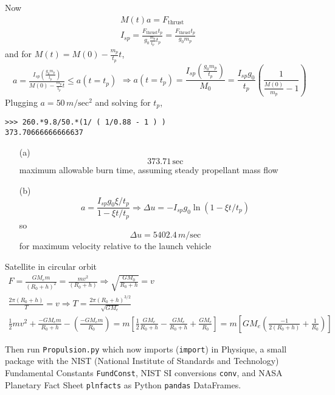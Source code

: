 \documentclass[10pt]{amsart}
\newcommand{\problemhead}[1]
  {
   \noindent{\small\bf Problem #1.}
   }
\begin{document}
\begin{multicols*}{2}
Now
\[
\begin{gathered}
  M(t) a = F_{\text{thrust}} \\ 
  I_{sp} = \frac{ F_{\text{thrust}} t_p }{ g_0 \frac{m_p}{t_p }t_p } = \frac{ F_{\text{thrust}} t_p }{ g_0 m_p }
\end{gathered}
\]
and for $M(t) = M(0)- \frac{m_p}{t_p}t$, 
\[
\begin{gathered}
  a = \frac{ I_{sp} \left( \frac{g_0 m_p }{t_p} \right) }{ M(0) - \frac{m_p}{t_p} t } \leq a(t=t_p)
\end{gathered} \Longrightarrow a(t=t_p) = \frac{I_{sp} \left( \frac{g_0 m_p }{ t_p } \right) }{M_0 } = \frac{ I_{sp} g_0 }{t_p} \left( \frac{1}{ \frac{M(0)}{m_p} - 1 } \right)
\]
Plugging $a = 50 \, m/\text{sec}^2$ and solving for $t_p$, 
\begin{lstlisting}
>>> 260.*9.8/50.*(1/ ( 1/0.88 - 1 ) )
373.70666666666637
\end{lstlisting}
\begin{enumerate}
\item[(a)]
\[
\boxed{ 373.71 \, \text{sec} }
\]
maximum allowable burn time, assuming steady propellant mass flow
\item[(b)]
\[
a = \frac{I_{sp} g_0 \xi / t_p }{ 1 - \xi t/t_p } \Longrightarrow \Delta u = - I_{sp} g_0 \ln{ ( 1 - \xi t/t_p ) }
\]
so
\[
\Delta u = 5402.4 \, m/\text{sec}
\]
for maximum velocity relative to the launch vehicle
\end{enumerate}

\problemhead{6} Satellite in circular orbit
\[
\begin{gathered}
  F = \frac{GM_em}{(R_0+h)^2} = \frac{mv^2}{(R_0 + h) } \Longrightarrow \sqrt{ \frac{GM_0}{R_0 + h} } = v \\
  \frac{ 2 \pi (R_0 + h ) }{T} = v \Longrightarrow T = \frac{ 2\pi (R_0 +h)^{3/2} }{\sqrt{GM_e} } \\
  \frac{1}{2} mv^2 + \frac{-GM_e m }{ R_0 + h} - \left( \frac{ -GM_e m }{ R_0 } \right) = m \left[ \frac{1}{2} \frac{GM_e}{R_0 + h} - \frac{GM_e}{R_0 + h } + \frac{GM_e}{R_0} \right] = m \left[ GM_e \left( \frac{-1}{ 2(R_0 + h ) } + \frac{1}{R_0} \right) \right]
\end{gathered}
\]

Then run \verb|Propulsion.py| which now imports (\verb|import|) in Physique, a small package with the NIST (National Institute of Standards and Technology) Fundamental Constants \verb|FundConst|, NIST SI conversions \verb|conv|, and NASA Planetary Fact Sheet \verb|plnfacts| as Python \verb|pandas| DataFrames.  



\end{multicols*}
\end{document}
